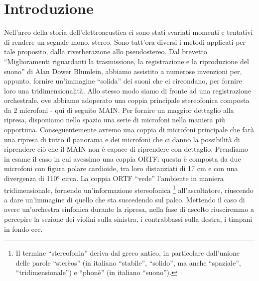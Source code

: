 \documentclass{article}
\begin{document}
\section{Introduzione}
    Nell'arco della storia dell'elettroacustica ci sono stati svariati momenti e tentativi di rendere un segnale mono, stereo. Sono tutt'ora diversi i metodi applicati per tale proposito, dalla riverberazione allo pseudostereo. Dal brevetto ``Miglioramenti riguardanti la trasmissione, la registrazione e la riproduzione del suono'' di Alan Dower Blumlein, abbiamo assistito a numerose invenzioni per, appunto, fornire un'immagine ``solida'' dei suoni che ci circondano, per fornire loro una tridimensionalità.
    Allo stesso modo siamo di fronte ad una registrazione orchestrale, ove abbiamo adoperato una coppia principale stereofonica composta da 2 microfoni - qui di seguito MAIN. Per fornire un maggior dettaglio alla ripresa, disponiamo nello spazio una serie di microfoni nella maniera più opportuna. Conseguentemente avremo una coppia di microfoni principale che farà una ripresa di tutto il panorama e dei microfoni che ci danno la possibilità di riprendere ciò che il MAIN non è capace di riprendere con dettaglio. Prendiamo in esame il caso in cui avessimo una coppia ORTF: questa è composta da due microfoni con figura polare cardioide, tra loro distanziati di 17 cm e con una divergenza di 110° circa. La coppia ORTF ``vede'' l'ambiente in maniera tridimensionale, fornendo un'informazione stereofonica
    \footnote{Il termine ``stereofonia'' deriva dal greco antico, in particolare dall'unione delle parole ``sterèos'' (in italiano ``stabile'', ``solido'', ma anche ``spaziale'', ``tridimensionale'') e ``phonè'' (in italiano ``suono'').}
    all'ascoltatore, riuscendo a dare un'immagine di quello che sta succedendo sul palco. Mettendo il caso di avere un'orchestra sinfonica durante la ripresa, nella fase di ascolto riusciremmo a percepire la sezione dei violini sulla sinistra, i contrabbassi sulla destra, i timpani in fondo ecc.
\end{document}
